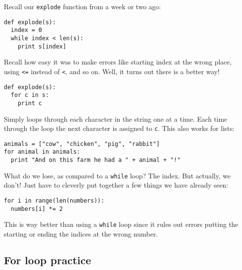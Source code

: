 \documentclass{article}
\begin{document}
Recall our \verb|explode| function from a week or two ago:
\begin{verbatim}
def explode(s):
  index = 0
  while index < len(s):
    print s[index]
\end{verbatim}
Recall how easy it was to make errors like starting index at the wrong
place, using \verb|<=| instead of \verb|<|, and so on.  Well, it turns
out there is a better way!
\begin{verbatim}
def explode(s):
  for c in s:
    print c
\end{verbatim}
Simply loops through each character in the string one at a time.  Each
time through the loop the next character is assigned to \verb|c|.
This also works for lists:
\begin{verbatim}
animals = ["cow", "chicken", "pig", "rabbit"]
for animal in animals:
  print "And on this farm he had a " + animal + "!"
\end{verbatim}
What do we lose, as compared to a \verb|while| loop?  The index. But
actually, we don't!  Just have to cleverly put together a few things
we have already seen:
\begin{verbatim}
for i in range(len(numbers)):
  numbers[i] *= 2
\end{verbatim}
This is way better than using a \verb|while| loop since it rules out
errors putting the starting or ending the indices at the wrong number.

\subsection*{For loop practice}
\end{document}
